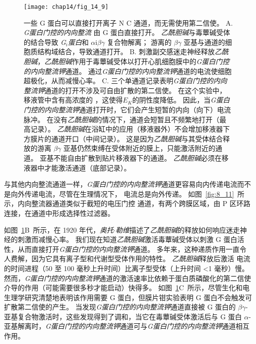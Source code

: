 \begin{figure}[htbp]
	\centering
	\texttt{[image: chap14/fig\_14\_9]}
	\caption{一些 G 蛋白可以直接打开离子 N C 通道，而无需使用第二信使。
		A. \textit{G蛋白门控的内向整流}  由 G 蛋白直接打开。
		\textit{乙酰胆碱}与毒蕈碱受体的结合导致 \textit{G$_i $蛋白}和 $\alpha$i$\beta \gamma$ 复合物解离；
		游离的 $\beta \gamma$ 亚基与通道的细胞质结构域结合，导致通道打开。
		B. 刺激副交感迷走神经释放\textit{乙酰胆碱}，\textit{乙酰胆碱}作用于毒蕈碱受体以打开心肌细胞膜中的\textit{G蛋白门控的内向整流钾}通道。
		通过\textit{G蛋白门控的内向整流钾}通道的电流使细胞超极化，从而减慢心率\cite{toda1967interactions}。
		C. 三个单通道记录表明\textit{G蛋白门控的内向整流钾}通道的打开不涉及可自由扩散的第二信使。
		在这个实验中，移液管中含有高浓度的 ，这使得$E_K$的阴性度降低。
		因此，当\textit{G蛋白门控的内向整流钾}通道打开时，它们会产生短暂的内向（向下）电流脉冲。
		在没有\textit{乙酰胆碱}的情况下，通道会短暂且不频繁地打开（最高记录）。
		\textit{乙酰胆碱}在浴缸中的应用（移液器外）不会增加移液器下方膜片的通道开口（中间记录）。
		这是因为\textit{乙酰胆碱}与其受体结合释放的游离 $\beta \gamma$ 亚基仍然束缚在受体附近的膜上，只能激活附近的通道。
		亚基不能自由扩散到贴片移液器下的通道。
		\textit{乙酰胆碱}必须在移液器中才能激活通道（底部记录）\cite{soejima1984mode}。}
	\label{fig:14_9}
\end{figure}


与其他内向整流通道一样，\textit{G蛋白门控的内向整流钾}通道更容易向内传递电流而不是向外传递电流，尽管在生理情况下， 电流总是向外传递。
如图~\ref{fig:8_11}~所示，内向整流器通道类似于截短的电压门控  通道，有两个跨膜区域，由 P 区环路连接，在通道中形成选择性过滤器。


如图~\ref{fig:14_9}B~所示，在 1920 年代，\textit{奥托$\cdot$勒维}描述了\textit{乙酰胆碱}的释放如何响应迷走神经的刺激而减慢心率。
我们现在知道\textit{乙酰胆碱}激活毒蕈碱受体以刺激 G 蛋白活性，从而直接打开\textit{G蛋白门控的内向整流钾}通道。
多年来，这种递质作用一直令人费解，因为它具有离子型和代谢型受体作用的特性。
\textit{乙酰胆碱}释放后激活  电流的时间进程（50 至 100 毫秒上升时间）比离子型受体（上升时间 <1 毫秒）慢。
然而，\textit{G蛋白门控的内向整流钾}通道的激活速率比依赖于蛋白质磷酸化的第二信使介导的作用（可能需要很多秒才能启动）快得多。
如图~\ref{fig:14_9}C~所示，尽管生化和电生理学研究清楚地表明该作用需要 G 蛋白，但膜片钳实验表明 G 蛋白不会触发可扩散第二信使的产生。
当发现\textit{G蛋白门控的内向整流钾}通道直接被 G 蛋白的 $\beta \gamma$-亚基复合物激活时，这些发现得到了调和，当它在毒蕈碱受体激活后与 G 蛋白 $\alpha$-亚基解离时，\textit{G蛋白门控的内向整流钾}通道可与\textit{G蛋白门控的内向整流钾}通道相互作用。


